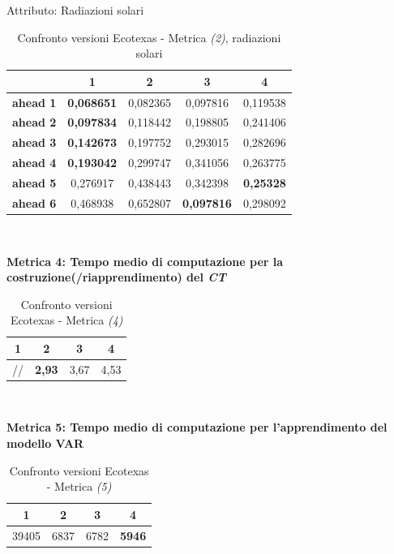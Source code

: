 \documentclass[12pt,a4paper,oneside,openright]{book}
\begin{document}
\medskip

Attributo: Radiazioni solari \\ 

\begin{table}[H]
\centering
\begin{tabular}{|c|c|c|c|c|}
\hline
& 1 & 2 & 3 & 4 \\
\hline
\textbf{ahead 1} & \textbf{0,068651} & 0,082365 & 0,097816 & 0,119538\\
\hline
\textbf{ahead 2} & \textbf{0,097834} & 0,118442 & 0,198805 & 0,241406\\ 
\hline
\textbf{ahead 3} & \textbf{0,142673} & 0,197752 & 0,293015 & 0,282696\\
\hline
\textbf{ahead 4} & \textbf{0,193042} & 0,299747 & 0,341056 & 0,263775\\ 
\hline
\textbf{ahead 5} & 0,276917 & 0,438443 & 0,342398 & \textbf{0,25328}\\
\hline
\textbf{ahead 6} & 0,468938 & 0,652807 & \textbf{0,097816} & 0,298092\\ 
\hline
\end{tabular} \\
\caption{Confronto versioni Ecotexas - Metrica \textit{(2)}, radiazioni solari}
\end{table} 

\medskip

\textbf{Metrica 4: Tempo medio di computazione per la costruzione(/riapprendimento) del \textit{CT}}

\medskip

\begin{table}[H]
\centering
\begin{tabular}[H]{|c|c|c|c|}
\hline
1 & 2 & 3 & 4\\
\hline
// & \textbf{2,93} & 3,67 & 4,53\\ 
\hline
\end{tabular} \\
\caption{Confronto versioni Ecotexas - Metrica \textit{(4)}}
\end{table}

\medskip

\textbf{Metrica 5: Tempo medio di computazione per l'apprendimento del modello VAR}

\medskip

\begin{table}[H]
\centering
\begin{tabular}[H]{|c|c|c|c|}
\hline
1 & 2 & 3 & 4\\
\hline
39405 & 6837 & 6782 & \textbf{5946}\\ 
\hline
\end{tabular} \\
\caption{Confronto versioni Ecotexas - Metrica \textit{(5)}}
\end{table}
\end{document}
